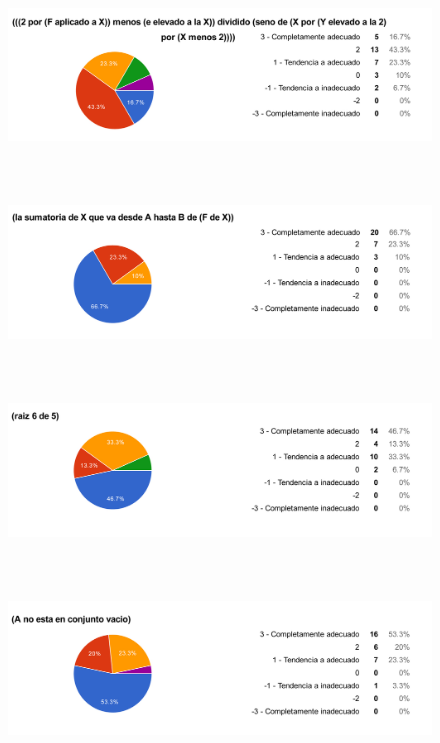 \begin{figure}[H]
\centering
	\includegraphics[width=15cm, height=4.74cm]{Figures/hjudgement/r4}
	\caption[]{}
\label{fig:parsed_corpus}
\end{figure}

\begin{figure}[H]
\centering
	\includegraphics[width=15cm, height=4.74cm]{Figures/hjudgement/r5}
	\caption[]{}
\label{fig:parsed_corpus}
\end{figure}

\begin{figure}[H]
\centering
	\includegraphics[width=15cm, height=4.74cm]{Figures/hjudgement/r6}
	\caption[]{}
\label{fig:parsed_corpus}
\end{figure}

\begin{figure}[H]
\centering
	\includegraphics[width=15cm, height=4.74cm]{Figures/hjudgement/r7}
	\caption[]{}
\label{fig:parsed_corpus}
\end{figure}

